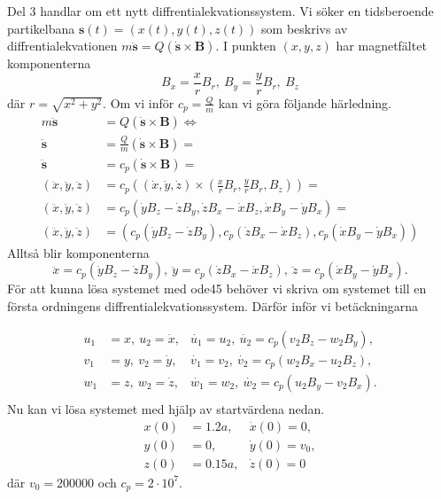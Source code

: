 \documentclass[a4paper]{article}
\begin{document}
Del 3 handlar om ett nytt diffrentialekvationssystem. Vi söker en tidsberoende
partikelbana $\mathbf{s}(t) = (x(t), y(t), z(t))$ som beskrivs av
diffrentialekvationen $m\mathbf{\ddot{s}} = Q(\mathbf{\dot{s}} \times
\mathbf{B})$. I punkten $(x, y, z)$ har magnetfältet komponenterna
$$
B_x = \frac{x}{r}B_r,\ B_y = \frac{y}{r}B_r,\ B_z
$$
där $r = \sqrt{x^2 + y^2}$. Om vi inför $c_p = \frac{Q}{m}$ kan vi göra följande
härledning.
\begin{eqnarray*}
  m\mathbf{\ddot{s}} & = Q(\mathbf{\dot{s}} \times \mathbf{B}) \Leftrightarrow
  \\
  \mathbf{\ddot{s}} & = \frac{Q}{m}(\mathbf{\dot{s}} \times \mathbf{B}) = 
  \\
  \mathbf{\ddot{s}} & = c_p(\mathbf{\dot{s}} \times \mathbf{B}) = 
  \\
  (\ddot{x}, \ddot{y}, \ddot{z})& = c_p((\dot{x},\dot{y},\dot{z}) \times
  (\frac{x}{r}B_r,\frac{y}{r}B_r,B_z)) = 
  \\
  (\ddot{x}, \ddot{y}, \ddot{z})& = c_p(\dot{y}B_z - \dot{z}B_y, 
  \dot{z}B_x - \dot{x}B_z, \dot{x}B_y - \dot{y}B_x) = 
  \\
  (\ddot{x}, \ddot{y}, \ddot{z})& = (c_p(\dot{y}B_z - \dot{z}B_y), 
  c_p(\dot{z}B_x - \dot{x}B_z), c_p(\dot{x}B_y - \dot{y}B_x))
\end{eqnarray*}
Alltså blir komponenterna 
$$
\ddot{x} = c_p(\dot{y}B_z - \dot{z}B_y),\ \ddot{y} = c_p(\dot{z}B_x -
\dot{x}B_z),\ \ddot{z} = c_p(\dot{x}B_y - \dot{y}B_x).
$$
För att kunna lösa systemet med ode45 behöver vi skriva om systemet till en
första ordningens diffrentialekvationssystem. Därför inför vi betäckningarna

\begin{align*}
  u_1 &= x,\ u_2 = \dot{x}, & \dot{u_1} = u_2,\ \dot{u_2} = c_p(v_2B_z -
  w_2B_y),\\
  v_1 &= y,\ v_2 = \dot{y},& \dot{v_1} = v_2,\ \dot{v_2} = c_p(w_2B_x - u_2B_z),\\
  w_1 &= z,\ w_2 = \dot{z},& \dot{w_1} = w_2,\ \dot{w_2} = c_p(u_2B_y - v_2B_x).\\
\end{align*}
Nu kan vi lösa systemet med hjälp av startvärdena nedan.
\begin{align*}
  x(0) &= 1.2a, & \dot{x}(0) = 0,\\
  y(0) &= 0,\ & \dot{y}(0) = v_0,\\
  z(0) &= 0.15a, & \dot{z}(0) = 0
\end{align*}
där $v_0 = 200000$ och $c_p = 2 \cdot 10^7$.
\end{document}
